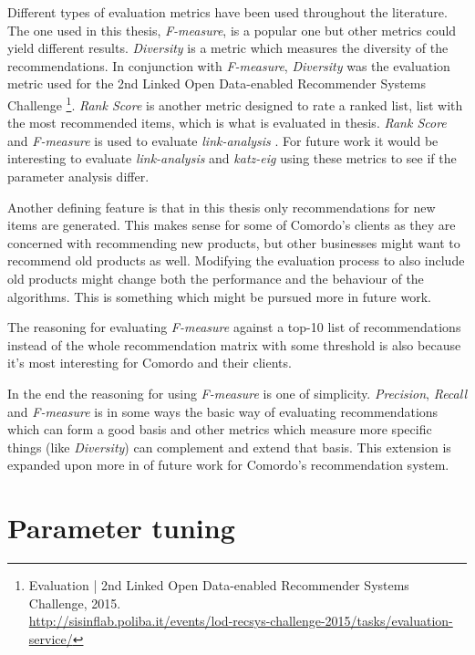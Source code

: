 Different types of evaluation metrics have been used throughout the literature. The one used in this thesis, \textit{F-measure}, is a popular one but other metrics could yield different results. \textit{Diversity} \citep{bobadilla2013recommender} is a metric which measures the diversity of the recommendations. In conjunction with \textit{F-measure}, \textit{Diversity} was the evaluation metric used for the 2nd Linked Open Data-enabled Recommender Systems Challenge
\footnote{
Evaluation | 2nd Linked Open Data-enabled Recommender Systems Challenge, 2015. \\
\url{http://sisinflab.poliba.it/events/lod-recsys-challenge-2015/tasks/evaluation-service/}
}.
\textit{Rank Score} \cite{huang2007comparison} is another metric designed to rate a ranked list, list with the most recommended items, which is what is evaluated in thesis. \textit{Rank Score} and \textit{F-measure} is used to evaluate \textit{link-analysis} \cite{huang2007comparison}. For future work it would be interesting to evaluate \textit{link-analysis} and \textit{katz-eig} using these metrics to see if the parameter analysis differ.

Another defining feature is that in this thesis only recommendations for new items are generated. This makes sense for some of Comordo's clients as they are concerned with recommending new products, but other businesses might want to recommend old products as well. Modifying the evaluation process to also include old products might change both the performance and the behaviour of the algorithms. This is something which might be pursued more in future work.

The reasoning for evaluating \textit{F-measure} against a top-10 list of recommendations instead of the whole recommendation matrix with some threshold is also because it's most interesting for Comordo and their clients.

In the end the reasoning for using \textit{F-measure} is one of simplicity. \textit{Precision}, \textit{Recall} and \textit{F-measure} is in some ways the basic way of evaluating recommendations which can form a good basis and other metrics which measure more specific things (like \textit{Diversity}) can complement and extend that basis. This extension is expanded upon more in  of future work for Comordo's recommendation system.


\section{Parameter tuning}

